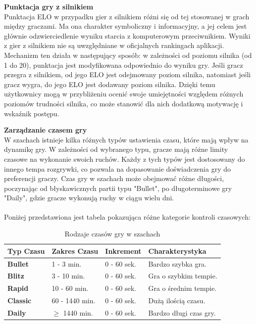 \documentclass[12pt,a4paper]{article}
\begin{document}
\noindent \textbf{Punktacja gry z silnikiem}\\
Punktacja ELO w przypadku gier z silnikiem różni się od tej stosowanej w grach między graczami. Ma ona charakter symboliczny i informacyjny, a jej celem jest głównie odzwierciedlenie wyniku starcia z komputerowym przeciwnikiem. Wyniki z gier z silnikiem nie są uwzględniane w oficjalnych rankingach aplikacji. Mechanizm ten działa w następujący sposób: w zależności od poziomu silnika (od 1 do 20), punktacja jest modyfikowana odpowiednio do wyniku gry. Jeśli gracz przegra z silnikiem, od jego ELO jest odejmowany poziom silnika, natomiast jeśli gracz wygra, do jego ELO jest dodawany poziom silnika. Dzięki temu użytkownicy mogą w przybliżeniu ocenić swoje umiejętności względem różnych poziomów trudności silnika, co może stanowić dla nich dodatkową motywację i wskaźnik postępu.

\newpage

\noindent \textbf{Zarządzanie czasem gry}\\
W szachach istnieje kilka różnych typów ustawienia czasu, które mają wpływ na dynamikę gry. W zależności od wybranego typu, gracze mają różne limity czasowe na wykonanie swoich ruchów. Każdy z tych typów jest dostosowany do innego tempa rozgrywki, co pozwala na dopasowanie doświadczenia gry do preferencji graczy. Czas gry w szachach może obejmować różne długości, poczynając od błyskawicznych partii typu "Bullet", po długoterminowe gry "Daily", gdzie gracze wykonują ruchy w ciągu wielu dni.
\\\\
Poniżej przedstawiona jest tabela pokazująca różne kategorie kontroli czasowych:

\renewcommand{\arraystretch}{1.5}
\begin{table}[h!]
    \centering
    \begin{tabular}{|l|m{3cm}|m{3cm}|m{5cm}|}
        \hline
        \rowcolor{lightgray}
        \textbf{Typ Czasu} & \textbf{Zakres Czasu} & \textbf{Inkrement} & \textbf{Charakterystyka} \\ \hline
        \textbf{Bullet} & 1 - 3 min. & 0 - 60 sek. & Bardzo szybka gra. \\ \hline
        \textbf{Blitz} & 3 - 10 min. & 0 - 60 sek. & Gra o szybkim tempie. \\ \hline
        \textbf{Rapid} & 10 - 60 min. & 0 - 60 sek. & Gra o średnim tempie. \\ \hline
        \textbf{Classic} & 60 - 1440 min. & 0 - 60 sek. & Dużą ilością czasu. \\ \hline
        \textbf{Daily} & $\geq$ 1440 min. & 0 - 60 sek. & Bardzo długi czas gry. \\ \hline
    \end{tabular}
    \caption{Rodzaje czasów gry w szachach}
\end{table}
\vspace{0.5cm}
\end{document}
